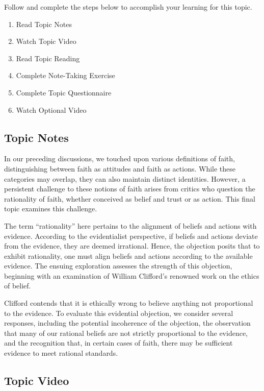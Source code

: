 \documentclass[
]{book}
\providecommand{\tightlist}{%
  \setlength{\itemsep}{0pt}\setlength{\parskip}{0pt}}
\begin{document}
Follow and complete the steps below to accomplish your learning for this topic.

\begin{enumerate}
\def\labelenumi{\arabic{enumi}.}
\tightlist
\item
  Read Topic Notes
\item
  Watch Topic Video
\item
  Read Topic Reading
\item
  Complete Note-Taking Exercise
\item
  Complete Topic Questionnaire
\item
  Watch Optional Video
\end{enumerate}

\hypertarget{topic-notes-7}{%
\subsection*{Topic Notes}\label{topic-notes-7}}

In our preceding discussions, we touched upon various definitions of faith, distinguishing between faith as attitudes and faith as actions. While these categories may overlap, they can also maintain distinct identities. However, a persistent challenge to these notions of faith arises from critics who question the rationality of faith, whether conceived as belief and trust or as action. This final topic examines this challenge.

The term ``rationality'' here pertains to the alignment of beliefs and actions with evidence. According to the evidentialist perspective, if beliefs and actions deviate from the evidence, they are deemed irrational. Hence, the objection posits that to exhibit rationality, one must align beliefs and actions according to the available evidence. The ensuing exploration assesses the strength of this objection, beginning with an examination of William Clifford's renowned work on the ethics of belief.

Clifford contends that it is ethically wrong to believe anything not proportional to the evidence. To evaluate this evidential objection, we consider several responses, including the potential incoherence of the objection, the observation that many of our rational beliefs are not strictly proportional to the evidence, and the recognition that, in certain cases of faith, there may be sufficient evidence to meet rational standards.

\hypertarget{topic-video-7}{%
\subsection*{Topic Video}\label{topic-video-7}}
\end{document}
